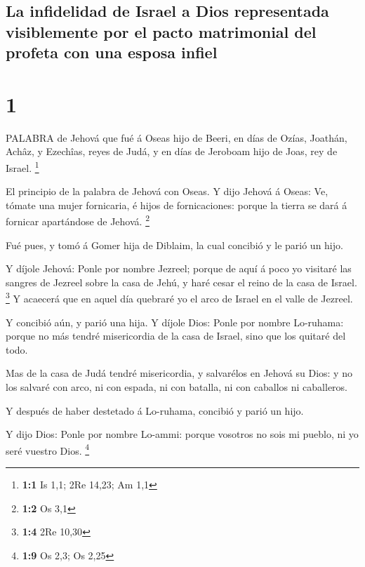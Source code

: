 \hypertarget{la-infidelidad-de-israel-a-dios-representada-visiblemente-por-el-pacto-matrimonial-del-profeta-con-una-esposa-infiel}{%
\subsection{La infidelidad de Israel a Dios representada visiblemente
por el pacto matrimonial del profeta con una esposa
infiel}\label{la-infidelidad-de-israel-a-dios-representada-visiblemente-por-el-pacto-matrimonial-del-profeta-con-una-esposa-infiel}}

\hypertarget{section}{%
\section{1}\label{section}}

 PALABRA de Jehová que fué á Oseas hijo de Beeri, en días de
Ozías, Joathán, Achâz, y Ezechîas, reyes de Judá, y en días de Jeroboam
hijo de Joas, rey de Israel. \footnote{\textbf{1:1} Is 1,1; 2Re 14,23;
  Am 1,1}

 El principio de la palabra de Jehová con Oseas. Y dijo
Jehová á Oseas: Ve, tómate una mujer fornicaria, é hijos de
fornicaciones: porque la tierra se dará á fornicar apartándose de
Jehová. \footnote{\textbf{1:2} Os 3,1}

 Fué pues, y tomó á Gomer hija de Diblaim, la cual concibió
y le parió un hijo.

 Y díjole Jehová: Ponle por nombre Jezreel; porque de aquí á
poco yo visitaré las sangres de Jezreel sobre la casa de Jehú, y haré
cesar el reino de la casa de Israel. \footnote{\textbf{1:4} 2Re 10,30}
 Y acaecerá que en aquel día quebraré yo el arco de Israel
en el valle de Jezreel.

 Y concibió aún, y parió una hija. Y díjole Dios: Ponle por
nombre Lo-ruhama: porque no más tendré misericordia de la casa de
Israel, sino que los quitaré del todo.

 Mas de la casa de Judá tendré misericordia, y salvarélos en
Jehová su Dios: y no los salvaré con arco, ni con espada, ni con
batalla, ni con caballos ni caballeros.

 Y después de haber destetado á Lo-ruhama, concibió y parió
un hijo.

 Y dijo Dios: Ponle por nombre Lo-ammi: porque vosotros no
sois mi pueblo, ni yo seré vuestro Dios. \footnote{\textbf{1:9} Os 2,3;
  Os 2,25}


